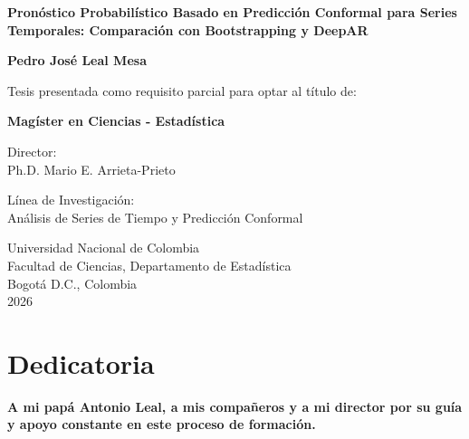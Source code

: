\documentclass[12pt,spanish,openany,letterpaper,pagesize]{scrbook}
\begin{document}
\begin{titlepage}
\thispagestyle{empty}
\centering
    
    {\huge\bfseries Pronóstico Probabilístico Basado en Predicción Conformal para Series Temporales: Comparación con Bootstrapping y DeepAR\par}
    
    \vspace{2cm}
    
    {\Large\bfseries Pedro José Leal Mesa\par}
    
    \vspace{2cm}
    
    Tesis presentada como requisito parcial para optar al título de:\\[0.3cm]
    {\bfseries Magíster en Ciencias - Estadística\par}
    
    \vspace{2cm}

    
    Director:\\
    Ph.D. Mario E. Arrieta-Prieto
    
    \vspace{2cm}
    
    Línea de Investigación:\\
    Análisis de Series de Tiempo y Predicción Conformal
    
    \vfill
    
    Universidad Nacional de Colombia\\
    Facultad de Ciencias, Departamento de Estadística\\
    Bogotá D.C., Colombia\\
    2026
    
\end{titlepage}


\thispagestyle{empty}
\chapter*{Dedicatoria}

\vspace*{3cm}

\textbf{A mi papá Antonio Leal, a mis compañeros y a mi director por su guía y apoyo constante en este proceso de formación.}
\end{document}
